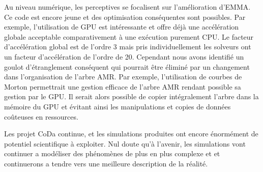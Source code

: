Au niveau numérique, les perceptives se focalisent sur l'amélioration d'EMMA. 
Ce code est encore jeune et des optimisation conséquentes sont possibles.
Par exemple, l'utilisation de GPU est intéressante et offre déjà une accélération globale acceptable comparativement à une exécution purement CPU.
Le facteur d'accélération global est de l'ordre 3 mais pris individuellement les solveurs ont un facteur d'accélération de l'ordre de 20.
Cependant nous avons identifié un goulot d'étranglement conséquent qui pourrait être éliminé par un changement dans l'organisation de l'arbre AMR.
Par exemple, l'utilisation de courbes de Morton permettrait une gestion efficace de l'arbre AMR rendant possible sa gestion par le GPU.
Il serait alors possible de copier intégralement l'arbre dans la mémoire du GPU et évitant ainsi les manipulations et copies de données coûteuses en ressources.

Les projet CoDa continue, et les simulations produites ont encore énormément de potentiel scientifique à exploiter.
Nul doute qu'à l'avenir, les simulations vont continuer a modéliser des phénomènes de plus en plus complexe et et continuerons a tendre vers une meilleure description de la réalité.







%



